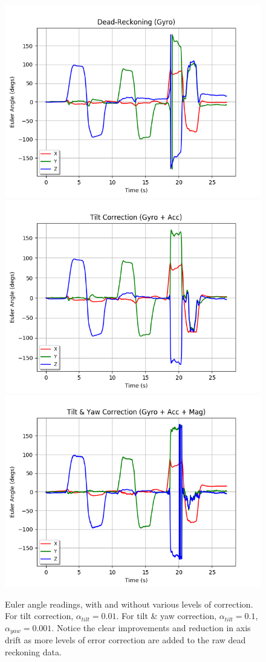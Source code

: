 \documentclass[11pt]{article}
\begin{document}
\begin{figure}[htp]

\centering
\includegraphics[width=.32\textwidth]{1gyro_dead}\hfill
\includegraphics[width=.32\textwidth]{2gyro_acc}\hfill
\includegraphics[width=.32\textwidth]{3gyro_acc_mag}

\caption{Euler angle readings, with and without various levels of correction. For tilt correction, $\alpha_{tilt}=0.01$. For tilt \& yaw correction, $\alpha_{tilt}=0.1$, $\alpha_{yaw}=0.001$. Notice the clear improvements and reduction in axis drift as more levels of error correction are added to the raw dead reckoning data.}
\label{fig:euler-angles}

\end{figure}
\end{document}
